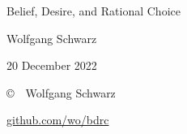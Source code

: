 \begingroup
\thispagestyle{empty}

\begin{center}

{
  \headerfont
  
  \huge Belief, Desire, and Rational Choice\par}

  \vspace{15mm}

  {\large Wolfgang Schwarz}

  \vspace{2mm}
  {\normalsize 20 December 2022}

\end{center}

\vfill
\endgroup
{

  \footnotesize

 \noindent \copyright\ \the\year\ Wolfgang Schwarz

 \smallskip
 \noindent \href{https://github.com/wo/bdrc}{github.com/wo/bdrc}

 \vspace{-1.5mm}
 \doclicenseThis

}

{
\small
\tableofcontents 
}



